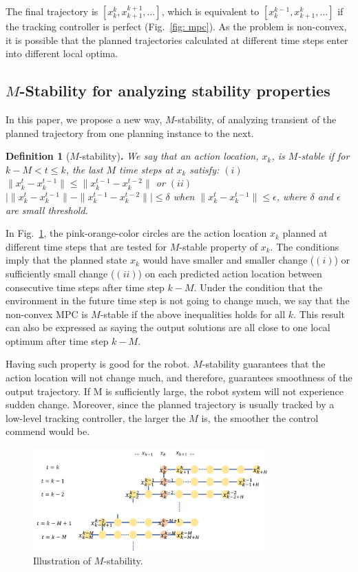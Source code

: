 \documentclass[letterpaper, 10 pt, conference]{ieeeconf}  %
\begin{document}
The final trajectory is $[x_k^k,x_{k+1}^{k+1},\ldots]$, which is equivalent to $[x_{k}^{k-1},x_{k+1}^{k},\ldots]$ if the tracking controller is perfect (Fig.~\ref{fig: mpc}). As the problem is non-convex, it is possible that the planned trajectories calculated at different time steps enter into different local optima. 

\subsection{$M$-Stability for analyzing stability properties}
In this paper, we propose a new way, $M$-stability, of analyzing transient of the planned trajectory from one planning instance to the next.

\textbf{Definition 1} ($M$-stability)\textbf{.}
\emph{
We say that an action location, $x_{k}$, is $M$-stable if for $k-M< t\leq k$, the last $M$ time steps at $x_{k}$ satisfy: $(i)$ $\|x_{k}^t-x_k^{t-1}\|\leq \|x_k^{t-1}-x_k^{t-2}\|$ or $(ii)$  $\bigl|\|x_{k}^t-x_k^{t-1}\|-\|x_k^{t-1}-x_k^{t-2}\|\bigr|\leq \delta$ when $\|x_{k}^t-x_k^{t-1}\|\leq\epsilon$, where $\delta$ and $\epsilon$ are small threshold. }


 In Fig.~\ref{fig:m-stable}, the pink-orange-color circles are the action location $x_{k}$ planned at different time steps that are  tested for $M$-stable property of $x_{k}$. The conditions imply that the planned state $x_k$ would have smaller and smaller change ($(i)$) or sufficiently small change ($(ii)$) on each predicted action location between consecutive time steps after time step $k-M$. Under the condition that the environment in the future time step is not going to change much, we say that the non-convex MPC is $M$-stable if the above inequalities holds for all $k$. This result can also be expressed as saying the output solutions are all close to one local optimum after time step $k-M$. 

Having such property is good for the robot. $M$-stability guarantees that the action location will not change much, and therefore, guarantees smoothness of the output trajectory. If M is sufficiently large, the robot system will not experience sudden change. Moreover, since the planned trajectory is usually tracked by a low-level tracking controller, the larger the $M$ is, the smoother the control commend would be.

\begin{figure}[t]
\begin{center}
\includegraphics[width=9cm]{src/Mstable.png}
\caption{Illustration of $M$-stability.}
\label{fig:m-stable}
\end{center}
\end{figure}
\end{document}
